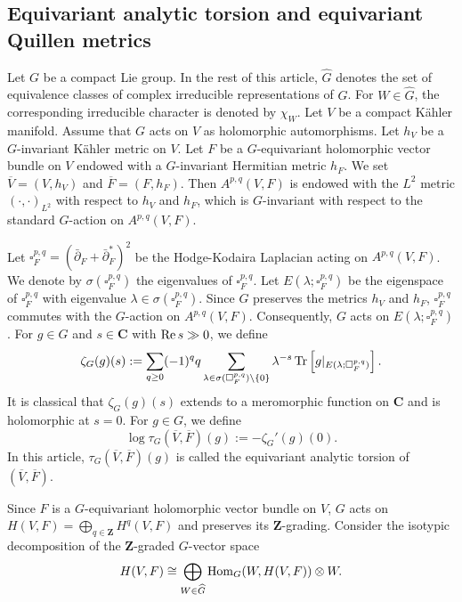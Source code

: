 \documentclass[amscd, leqno]{amsart}
\theoremstyle{plain}
\theoremstyle{definition}
\theoremstyle{remark}
\begin{document}
\subsection
{\bf Equivariant analytic torsion and equivariant Quillen metrics}
\label{sect:1.1}
\par
Let $G$ be a compact Lie group. In the rest of this article, $\widehat{G}$ denotes the set of equivalence classes of complex irreducible representations of $G$. For $W\in\widehat{G}$, the corresponding irreducible character is denoted by $\chi_{W}$. 
Let $V$ be a compact K\"ahler manifold. Assume that $G$ acts on $V$ as holomorphic automorphisms. 
Let $h_{V}$ be a $G$-invariant K\"ahler metric on $V$. 
Let $F$ be a $G$-equivariant holomorphic vector bundle on $V$ endowed with a $G$-invariant Hermitian metric $h_{F}$.
We set $\overline{V}=(V,h_{V})$ and $\overline{F}=(F,h_{F})$.
Then $A^{p,q}(V,F)$ is endowed with the $L^{2}$ metric $(\cdot,\cdot)_{L^{2}}$ with respect to $h_{V}$ and $h_{F}$,
which is $G$-invariant with respect to the standard $G$-action on $A^{p,q}(V,F)$.
\par
Let $\square_{F}^{p,q} = (\bar{\partial}_{F}+\bar{\partial}^{*}_{F})^{2}$ be the Hodge-Kodaira Laplacian acting on $A^{p,q}(V,F)$. 
We denote by $\sigma(\square_{F}^{p,q})$ the eigenvalues of $\square_{F}^{p,q}$.
Let $E(\lambda; \square_{F}^{p,q})$ be the eigenspace of $\square_{F}^{p,q}$ with eigenvalue $\lambda\in\sigma(\square_{F}^{p,q})$. 
Since $G$ preserves the metrics $h_{V}$ and $h_{F}$, $\square_{F}^{p,q}$ commutes with the $G$-action on $A^{p,q}(V,F)$. 
Consequently, $G$ acts on $E(\lambda; \square_{F}^{p,q})$.
For $g\in G$ and $s\in{\mathbf C}$ with ${\rm Re}\,s\gg0$, we define
$$
\zeta_{G}(g)(s) := 
\sum_{q\geq 0} (-1)^{q}q \sum_{\lambda\in\sigma(\square_{F}^{p,q})\setminus\{0\}} 
\lambda^{-s}\,{\rm Tr}\left[ g|_{E(\lambda; \square_{F}^{p,q})} \right].
$$ 
It is classical that $\zeta_{G}(g)(s)$ extends to a meromorphic function on ${\mathbf C}$ and is holomorphic at $s=0$. 
For $g\in G$, we define
$$
\log\tau_{G}(\overline{V},\overline{F})(g) := -\zeta_{G}'(g)(0).
$$
In this article, $\tau_{G}(\overline{V},\overline{F})(g)$ is called the equivariant analytic torsion of $(\overline{V},\overline{F})$.
\par
Since $F$ is a $G$-equivariant holomorphic vector bundle on $V$, $G$ acts on $H(V,F) = \bigoplus_{q\in{\mathbf Z}} H^{q}(V,F)$ and preserves its ${\mathbf Z}$-grading. Consider the isotypic decomposition of the ${\mathbf Z}$-graded $G$-vector space
$$
H(V,F) \cong \bigoplus_{W\in\widehat{G}} {\rm Hom}_{G}(W,H(V,F))\otimes W.
$$
\end{document}
